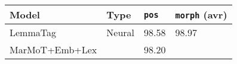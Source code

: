 \documentclass{report}
\theoremstyle{definition}
\theoremstyle{plain}
\theoremstyle{definition}
\theoremstyle{remark}
\numberwithin{equation}{section}
\numberwithin{figure}{section}
\numberwithin{table}{section}
\begin{document}
\begin{table}[H]\centering
	\begin{tabular}[t]{@{}
			>{\arraybackslash}p{}
			>{\arraybackslash}p{}
			>{\arraybackslash}p{}
			>{\arraybackslash}p{}		
@{}}\toprule\begin{minipage}[t]{\linewidth}\centering

		\textbf{Model}
		\end{minipage} & \begin{minipage}[t]{\linewidth}\centering

		\textbf{Type}
		\end{minipage} & \begin{minipage}[t]{\linewidth}\centering

		\textbf{\texttt{pos}}
		\end{minipage} & \begin{minipage}[t]{\linewidth}\centering

		\textbf{\texttt{morph} (avr)}
		\end{minipage}\\\midrule\begin{minipage}[t]{\linewidth}\raggedright

		LemmaTag
		\end{minipage} & \begin{minipage}[t]{\linewidth}\raggedright

		Neural
		\end{minipage} & \begin{minipage}[t]{\linewidth}\raggedright

		98.58
		\end{minipage} & \begin{minipage}[t]{\linewidth}\raggedright

		98.97
		\end{minipage}\\\midrule\begin{minipage}[t]{\linewidth}\raggedright

		MarMoT+Emb+Lex
		\end{minipage} & \begin{minipage}[t]{\linewidth}\raggedright
		\end{minipage} & \begin{minipage}[t]{\linewidth}\raggedright

		98.20
		\end{minipage} & \begin{minipage}[t]{\linewidth}\raggedright


\end{minipage}
\end{tabular}
\end{table}
\end{document}
